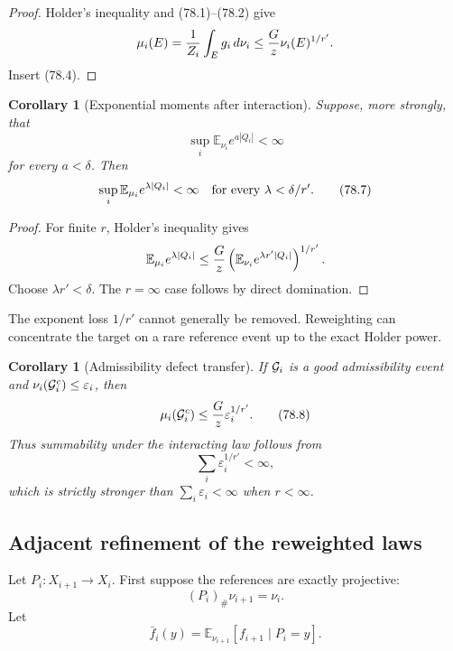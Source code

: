 \documentclass[11pt]{article}
\newtheorem{corollary}[theorem]{Corollary}
\begin{document}
\begin{proof}
Holder's inequality and (78.1)--(78.2) give
\[
 \mu_i(E)
 ={1\over Z_i}\int_Eg_i\,d\nu_i
 \le {G\over z}\nu_i(E)^{1/r'}.
\]
Insert (78.4).
\end{proof}

\begin{corollary}[Exponential moments after interaction]
\label{cor:v11v78-moment}
Suppose, more strongly, that
\[
                  \sup_i\mathbb E_{\nu_i}e^{a|Q_i|}<\infty
                                                                  \tag{78.6}
\]
for every \(a<\delta\).  Then
\[
                  \sup_i\mathbb E_{\mu_i}e^{\lambda|Q_i|}
                  <\infty
            \quad\hbox{for every }\lambda<\delta/r'.          \tag{78.7}
\]
\end{corollary}

\begin{proof}
For finite \(r\), Holder's inequality gives
\[
 \mathbb E_{\mu_i}e^{\lambda|Q_i|}
 \le {G\over z}
       \left(\mathbb E_{\nu_i}e^{\lambda r'|Q_i|}\right)^{1/r'}.
\]
Choose \(\lambda r'<\delta\).  The \(r=\infty\) case follows by direct
domination.
\end{proof}

The exponent loss \(1/r'\) cannot generally be removed.  Reweighting
can concentrate the target on a rare reference event up to the exact
Holder power.

\begin{corollary}[Admissibility defect transfer]
\label{cor:v11v78-admissible}
If \({\cal G}_i\) is a good admissibility event and
\(\nu_i({\cal G}_i^c)\le\varepsilon_i\), then
\[
               \mu_i({\cal G}_i^c)
               \le {G\over z}\varepsilon_i^{1/r'}.            \tag{78.8}
\]
Thus summability under the interacting law follows from
\[
                            \sum_i\varepsilon_i^{1/r'}<\infty, \tag{78.9}
\]
which is strictly stronger than \(\sum_i\varepsilon_i<\infty\) when
\(r<\infty\).
\end{corollary}

\subsection{Adjacent refinement of the reweighted laws}

Let \(P_i:X_{i+1}\to X_i\).  First suppose the references are exactly
projective:
\[
                              (P_i)_\#\nu_{i+1}=\nu_i.          \tag{78.10}
\]
Let
\[
 \bar f_i(y)=
 \mathbb E_{\nu_{i+1}}\!\left[f_{i+1}\mid P_i=y\right].       \tag{78.11}
\]
\end{document}
